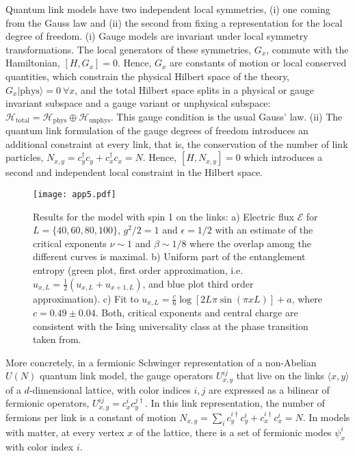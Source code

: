 \documentclass[epj,final]{svjour}
\begin{document}
Quantum link models have two independent local symmetries, (i) one coming from the Gauss law and (ii) the second from fixing a representation for the local degree of freedom. (i) Gauge models are invariant under local symmetry transformations. The local generators of these symmetries, $G_{x}$, commute with the Hamiltonian, $\left[ H, G_{x} \right]=0$. Hence, $G_{x}$ are constants of motion or local conserved quantities, which constrain the physical Hilbert space of the theory, $G_{x}|\text{phys} \rangle =0~ \forall x$, and the total Hilbert space splits in a physical or gauge invariant subspace and a gauge variant or unphysical subspace: $\mathcal{H}_{\text{total}} = \mathcal{H}_{\text{phys}} \oplus \mathcal{H}_{\text{unphys}}$. This gauge condition is the usual Gauss' law. (ii) The quantum link formulation of the gauge degrees of freedom introduces an additional constraint at every link, that is, the conservation of the number of link particles, $N_{x,y}=c^{\dagger}_{y} c_{y} + c^{\dagger}_{x} c_{x} =N$.  Hence, $\left[H,N_{x,y}\right]=0$ which introduces a second and independent local constraint in the Hilbert space.

\begin{figure}
\texttt{[image: app5.pdf]}
\caption{Results  for  the  model  with  spin 1  on  the  links:  a)  Electric  flux $\mathcal{E}$ for $L=\{ 40,60,80,100 \}$, $g^{2}/2=1$ and $ \epsilon = 1/2$ with an estimate of the critical exponents $\nu \sim 1$ and $\beta \sim 1/8$ where the overlap among the different curves is maximal.  b) Uniform part of the entanglement entropy (green plot, first order approximation, i.e. $u_{x,L} =\frac{1}{2} \left( u_{x,L} + u_{x+1,L} \right)$, and blue plot third order approximation). c) Fit to $u_{x,L}=\frac{c}{6} \log{ \left[ 2 L \pi \sin{ \left( \pi x L \right)} \right] }+ a$, where $c= 0.49 \pm 0.04$.  Both, critical exponents and central charge are consistent with the Ising universality class at the phase transition taken from\cite{rico2014tensor}. }
\label{app5}
\end{figure}

More concretely, in a fermionic Schwinger representation of a non-Abelian $U(N)$ quantum link model, the gauge operators $U^{ij}_{x,y}$ that live on the links $\langle x, y \rangle$ of a $d$-dimensional lattice, with color indices $i,j$ are expressed as a bilinear of fermionic operators, $U^{ij}_{x,y}=c^{i}_{x}c^{j \dagger}_{y}$. In this link representation, the number of fermions per link is a constant of motion $N_{x,y}=\sum_{i} c^{i \dagger}_{y} c^{i}_{y} + c^{i \dagger}_{x} c^{i}_{x} =N$. In models with matter, at every vertex $x$ of the lattice, there is a set of fermionic modes $\psi^{i}_{x}$ with color index $i$.
\end{document}
